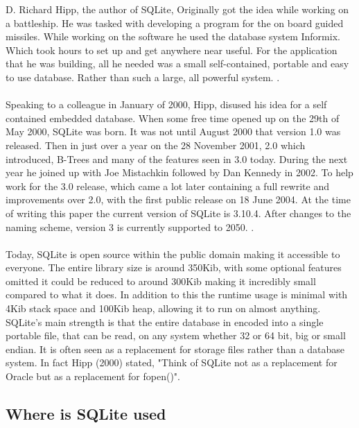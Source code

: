 D. Richard Hipp, the author of SQLite, Originally got the idea while working on a battleship. He was tasked with developing a program for the on board guided missiles. While working on the software he used the database system Informix. Which took hours to set up and get anywhere near useful. For the application that he was building, all he needed was a small self-contained, portable and easy to use database. Rather than such a large, all powerful system. \citep{sqlitedefguide}.
\\\\
Speaking to a colleague in January of 2000, Hipp, disused his idea for a self contained embedded database. When some free time opened up on the 29th of May 2000, SQLite was born. It was not until August 2000 that version 1.0 was released. Then in just over a year on the 28 November 2001, 2.0 which introduced, B-Trees and many of the features seen in 3.0 today. During the next year he joined up with Joe Mistachkin followed by Dan Kennedy in 2002. To help work for the 3.0 release, which came a lot later containing a full rewrite and improvements over 2.0, with the first public release on 18 June 2004. At the time of writing this paper the current version of SQLite is 3.10.4. After changes to the naming scheme, version 3 is currently supported to 2050. \citep{sqlite}.
\\\\
Today, SQLite is open source within the public domain making it accessible to everyone. The entire library size is around 350Kib, with some optional features omitted it could be reduced to around 300Kib making it incredibly small compared to what it does. In addition to this the runtime usage is minimal with 4Kib stack space and 100Kib heap, allowing it to run on almost anything. SQLite's main strength is that the entire database in encoded into a single portable file, that can be read, on any system whether 32 or 64 bit, big or small endian. It is often seen as a replacement for storage files rather than a database system. In fact Hipp (2000) stated, "Think of SQLite not as a replacement for Oracle but as a replacement for fopen()".

\subsection{Where is SQLite used}
\label{subsec:where_is_sqlite}

